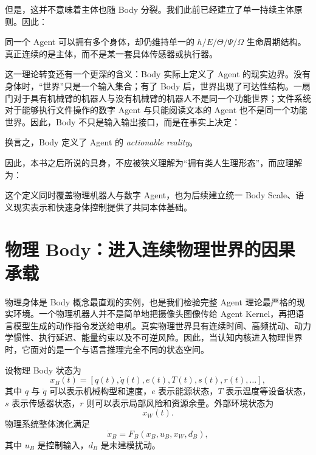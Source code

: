 但是，这并不意味着主体也随 Body 分裂。我们此前已经建立了单一持续主体原则。因此：
\begin{statementbox}
\centering
{}
\end{statementbox}
同一个 Agent 可以拥有多个身体，却仍维持单一的 $h/E/\Theta/\Psi/\Omega$ 生命周期结构。真正连续的是主体，而不是某一套具体传感器或执行器。

这一理论转变还有一个更深的含义：Body 实际上定义了 Agent 的现实边界。没有身体时，“世界”只是一个输入集合；有了 Body 后，世界出现了可达性结构。一扇门对于具有机械臂的机器人与没有机械臂的机器人不是同一个功能世界；文件系统对于能够执行文件操作的数字 Agent 与只能阅读文本的 Agent 也不是同一个功能世界。因此，Body 不只是输入输出接口，而是在事实上决定：
\begin{statementbox}
\centering
{}
\end{statementbox}
换言之，Body 定义了 Agent 的 \emph{actionable reality}。

因此，本书之后所说的具身，不应被狭义理解为“拥有类人生理形态”，而应理解为：
\begin{statementbox}
\centering
{}
\end{statementbox}
这个定义同时覆盖物理机器人与数字 Agent，也为后续建立统一 Body Scale、语义现实表示和快速身体控制提供了共同本体基础。

\section{物理 Body：进入连续物理世界的因果承载}

物理身体是 Body 概念最直观的实例，也是我们检验完整 Agent 理论最严格的现实环境。一个物理机器人并不是简单地把摄像头图像传给 Agent Kernel，再把语言模型生成的动作指令发送给电机。真实物理世界具有连续时间、高频扰动、动力学惯性、执行延迟、能量约束以及不可逆风险。因此，当认知内核进入物理世界时，它面对的是一个与语言推理完全不同的状态空间。

设物理 Body 状态为
\[
x_B(t)
=
[
q(t),
\dot q(t),
e(t),
T(t),
s(t),
r(t),
\ldots
],
\]
其中 $q$ 与 $\dot q$ 可以表示机械构型和速度，$e$ 表示能源状态，$T$ 表示温度等设备状态，$s$ 表示传感器状态，$r$ 则可以表示局部风险和资源余量。外部环境状态为
\[
x_W(t).
\]
物理系统整体演化满足
\[
\dot{x}_B
=
F_B
\left(
x_B,
u_B,
x_W,
d_B
\right),
\]
其中 $u_B$ 是控制输入，$d_B$ 是未建模扰动。

